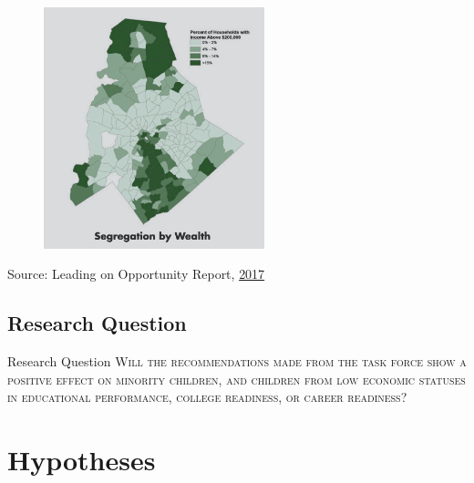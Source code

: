 \documentclass[10pt]{beamer}
\begin{document}
\begin{frame}
    \begin{figure}
        \caption{}
        \includegraphics[height=7cm]{Chetty_Chart.png}
        \label{fig7}
    \end{figure}
    Source: Leading on Opportunity Report, \href{https://s3.amazonaws.com/static.leadingonopportunity.org/downloads/LeadingOnOpportunity_Report-Compressed.pdf}{2017}
\end{frame}

\subsection[Research Question]{Research Question}

\begin{frame}{Research Question}
    \fontsize{12pt}{7.2}
    \large{\textsc{Will the recommendations made from the task force show a positive effect on minority children, and children from low economic statuses in educational performance, college readiness, or career readiness?}}

\end{frame}

\section[Hypotheses]{Hypotheses}
\end{document}
